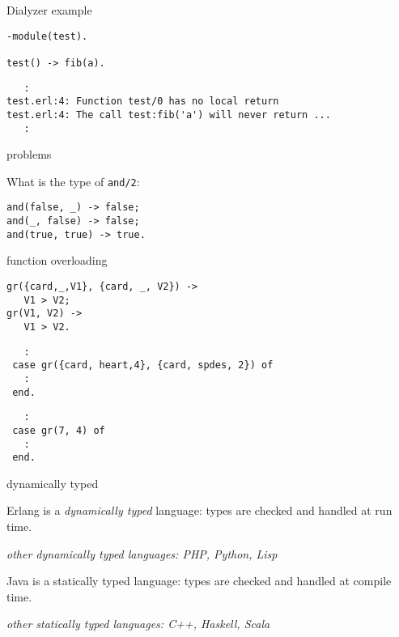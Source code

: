 \begin{frame}[fragile]{Dialyzer example}

\begin{verbatim}
-module(test).

test() -> fib(a).
\end{verbatim}

\pause\vspace{20pt}

\begin{verbatim}
   :
test.erl:4: Function test/0 has no local return
test.erl:4: The call test:fib('a') will never return ...
   :
\end{verbatim}

\end{frame}

\begin{frame}[fragile]{problems}

What is the type of {\tt and/2}:

\begin{verbatim}
and(false, _) -> false;
and(_, false) -> false;
and(true, true) -> true.
\end{verbatim}

\end{frame}

\begin{frame}[fragile]{function overloading}

\begin{verbatim}
gr({card,_,V1}, {card, _, V2}) -> 
   V1 > V2;
gr(V1, V2) -> 
   V1 > V2.
\end{verbatim}

\pause\vspace{20pt}
\begin{verbatim}
   :
 case gr({card, heart,4}, {card, spdes, 2}) of
   :
 end.
\end{verbatim}

\pause\vspace{10pt}

\begin{verbatim}
   :
 case gr(7, 4) of
   :
 end.
\end{verbatim}

\end{frame}

\begin{frame}{dynamically typed}

Erlang is a {\em dynamically typed} language: types are checked and handled at run time.

{\em other dynamically typed languages: PHP, Python, Lisp}

\vspace{20pt}

Java is a {statically typed} language: types are checked and handled at compile time.

{\em other statically typed languages: C++, Haskell, Scala}

\end{frame}

